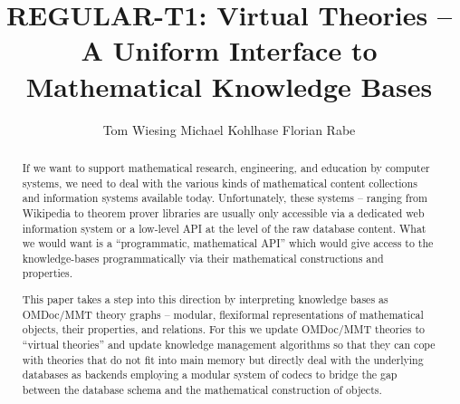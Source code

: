 \documentclass{llncs}
\title{REGULAR-T1: Virtual Theories -- A Uniform Interface to Mathematical Knowledge Bases}
\author{
Tom Wiesing\inst{1}
Michael Kohlhase\inst{1} 
Florian Rabe\inst{2} 
}
\institute{
   FAU Erlangen-N\"urnberg
   \and Jacobs University Bremen
}
\providecommand{\ommt}{\textsf{OMDoc}/\textsf{MMT}\xspace}
\begin{document}
\maketitle
\begin{abstract}
  If we want to support mathematical research, engineering, and education by computer systems, we need to deal with the various kinds of mathematical content collections and information systems available today. Unfortunately, these systems -- ranging from Wikipedia to theorem prover libraries are usually only accessible via a dedicated web information system or a low-level API at the level of the raw database content.  What we would want is a ``programmatic, mathematical API'' which would give access to the knowledge-bases programmatically via their mathematical constructions and properties.

  This paper takes a step into this direction by interpreting knowledge bases as \ommt theory graphs -- modular, flexiformal representations of mathematical objects, their properties, and relations. 
  For this we update \ommt theories to ``virtual theories'' and update knowledge management algorithms so that they can cope with theories that do not fit into main memory but directly deal with the underlying databases as backends employing a modular system of codecs to bridge the gap between the database schema and the mathematical construction of objects.
\end{abstract}







\printbibliography
\end{document}
